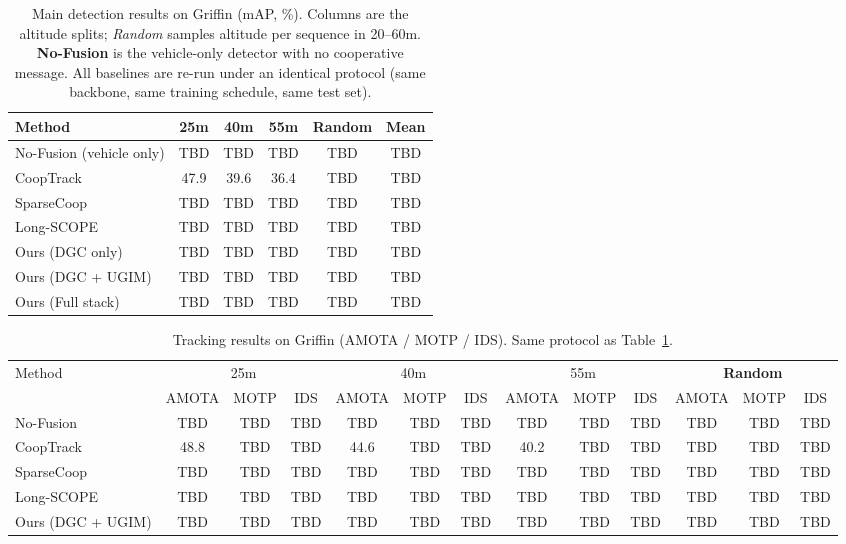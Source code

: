 \documentclass[9.5pt,twocolumn,a4paper]{IEEEtran}
\begin{document}
\begin{table}[htbp]
    \centering
    \caption{Main detection results on Griffin (mAP, \%). Columns are the altitude splits; \emph{Random} samples altitude per sequence in 20--60m. \textbf{No-Fusion} is the vehicle-only detector with no cooperative message. All baselines are re-run under an identical protocol (same backbone, same training schedule, same test set).}
    \begin{tabular}{l|cccc|c}
        \toprule
        Method & 25m & 40m & 55m & \textbf{Random} & Mean \\
        \midrule
        No-Fusion (vehicle only)         & TBD & TBD & TBD & TBD & TBD \\
        CoopTrack~\cite{cooptrack}       & 47.9 & 39.6 & 36.4 & TBD & TBD \\
        SparseCoop~\cite{sparsecoop}     & TBD & TBD & TBD & TBD & TBD \\
        Long-SCOPE~\cite{longscope}      & TBD & TBD & TBD & TBD & TBD \\
        \midrule
        Ours (DGC only)                  & TBD & TBD & TBD & TBD & TBD \\
        Ours (DGC + UGIM)                & TBD & TBD & TBD & TBD & TBD \\
        Ours (Full stack)                & TBD & TBD & TBD & TBD & TBD \\
        \bottomrule
    \end{tabular}
    \label{tab:main}
\end{table}

\begin{table}[htbp]
    \centering
    \caption{Tracking results on Griffin (AMOTA / MOTP / IDS). Same protocol as Table~\ref{tab:main}.}
    \begin{tabular}{l|ccc|ccc|ccc|ccc}
        \toprule
        \multirow{2}{*}{Method} & \multicolumn{3}{c|}{25m} & \multicolumn{3}{c|}{40m} & \multicolumn{3}{c|}{55m} & \multicolumn{3}{c}{\textbf{Random}} \\
        \cline{2-13}
        & AMOTA & MOTP & IDS & AMOTA & MOTP & IDS & AMOTA & MOTP & IDS & AMOTA & MOTP & IDS \\
        \midrule
        No-Fusion          & TBD & TBD & TBD & TBD & TBD & TBD & TBD & TBD & TBD & TBD & TBD & TBD \\
        CoopTrack          & 48.8 & TBD & TBD & 44.6 & TBD & TBD & 40.2 & TBD & TBD & TBD & TBD & TBD \\
        SparseCoop         & TBD & TBD & TBD & TBD & TBD & TBD & TBD & TBD & TBD & TBD & TBD & TBD \\
        Long-SCOPE         & TBD & TBD & TBD & TBD & TBD & TBD & TBD & TBD & TBD & TBD & TBD & TBD \\
        \midrule
        Ours (DGC + UGIM)  & TBD & TBD & TBD & TBD & TBD & TBD & TBD & TBD & TBD & TBD & TBD & TBD \\
        \bottomrule
    \end{tabular}
    \label{tab:main_track}
\end{table}
\end{document}
